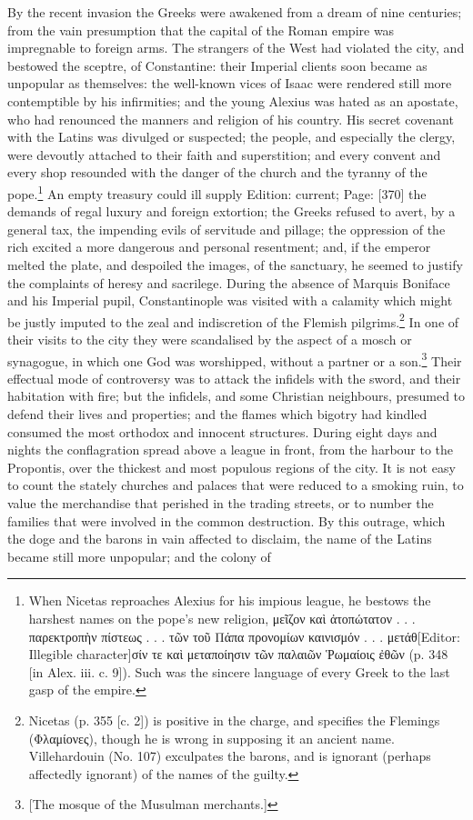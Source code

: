 By the recent invasion the Greeks were awakened from a dream of nine centuries; from the vain presumption that the capital of the Roman empire was impregnable to foreign arms. The strangers of the West had violated the city, and bestowed the sceptre, of Constantine: their Imperial clients soon became as unpopular as themselves: the well-known vices of Isaac were rendered still more contemptible by his infirmities; and the young Alexius was hated as an apostate, who had renounced the manners and religion of his country. His secret covenant with the Latins was divulged or suspected; the people, and especially the clergy, were devoutly attached to their faith and superstition; and every convent and every shop resounded with the danger of the church and the tyranny of the pope.\footnote{When Nicetas reproaches Alexius for his impious league, he bestows the harshest names on the pope\texthebrew{}’s new religion, \textgreek{με\texthebrew{ῖ}ζον κα\texthebrew{ὶ ἀ}τοπώτατον . . . παρεκτροπ\texthebrew{ὴ}ν πίστεως . . . τ\texthebrew{ῶ}ν το\texthebrew{ῦ} Πάπα προνομίων καινισμόν . . . μετάθ}[Editor: Illegible character]\textgreek{σίν τε κα\texthebrew{ὶ} μεταποίησιν τ\texthebrew{ῶ}ν παλαι\texthebrew{ῶ}ν \texthebrew{Ῥ}ωμαίοις \texthebrew{ἐ}θ\texthebrew{ῶ}ν} (p. 348 [in Alex. iii. c. 9]). Such was the sincere language of every Greek to the last gasp of the empire.} An empty treasury could ill supply Edition: current; Page: [370] the demands of regal luxury and foreign extortion; the Greeks refused to avert, by a general tax, the impending evils of servitude and pillage; the oppression of the rich excited a more dangerous and personal resentment; and, if the emperor melted the plate, and despoiled the images, of the sanctuary, he seemed to justify the complaints of heresy and sacrilege. During the absence of Marquis Boniface and his Imperial pupil, Constantinople was visited with a calamity which might be justly imputed to the zeal and indiscretion of the Flemish pilgrims.\footnote{Nicetas (p. 355 [c. 2]) is positive in the charge, and specifies the Flemings (\textgreek{Φλαμίονες}), though he is wrong in supposing it an ancient name. Villehardouin (No. 107) exculpates the barons, and is ignorant (perhaps affectedly ignorant) of the names of the guilty.} In one of their visits to the city they were scandalised by the aspect of a mosch or synagogue, in which one God was worshipped, without a partner or a son.\footnote{[The mosque of the Musulman merchants.]} Their effectual mode of controversy was to attack the infidels with the sword, and their habitation with fire; but the infidels, and some Christian neighbours, presumed to defend their lives and properties; and the flames which bigotry had kindled consumed the most orthodox and innocent structures. During eight days and nights the conflagration spread above a league in front, from the harbour to the Propontis, over the thickest and most populous regions of the city. It is not easy to count the stately churches and palaces that were reduced to a smoking ruin, to value the merchandise that perished in the trading streets, or to number the families that were involved in the common destruction. By this outrage, which the doge and the barons in vain affected to disclaim, the name of the Latins became still more unpopular; and the colony of 